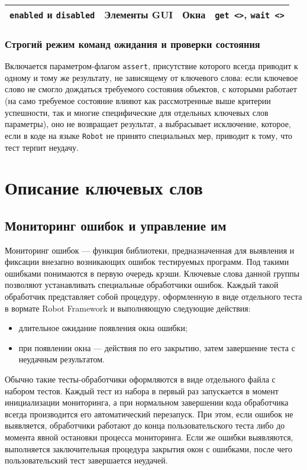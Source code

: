 \documentclass[11pt]{book} %
\begin{document}
\begin{center}
\begin{tabular}{|p{90pt}|p{120pt}|p{100pt}|p{60pt}|}
		\verb|enabled| и \verb|disabled| & Элементы GUI & Окна & \verb|get <>|,  \verb|wait <>|\\ \hline
		
	\end{tabular}
\end{center}


\subsection{Строгий режим команд ожидания и проверки состояния}

Включается параметром-флагом \verb|assert|, присутствие которого всегда приводит к одному и тому же результату, не зависящему от ключевого слова: если ключевое слово не смогло дождаться требуемого состояния объектов, с которыми работает (на само требуемое состояние влияют как рассмотренные выше критерии успешности, так и многие специфические для отдельных ключевых слов параметры), оно не возвращает результат, а выбрасывает исключение, которое, если в коде на языке \verb|Robot| не принято специальных мер, приводит к тому, что тест терпит неудачу.

\chapter{Описание ключевых слов}


\section{Мониторинг ошибок и управление им}

Мониторинг ошибок --- функция библиотеки, предназначенная для выявления и фиксации внезапно возникающих ошибок тестируемых программ. Под такими ошибками понимаются в первую очередь крэши. Ключевые слова данной группы позволяют устанавливать специальные обработчики ошибок. Каждый такой обработчик представляет собой процедуру, оформленную в виде отдельного теста в вормате Robot Framework и выполняющую следующие действия:

\begin{itemize}
\item длительное ожидание появления окна ошибки;
\item при появлении окна --- действия по его закрытию, затем завершение теста с неудачным результатом. 
\end{itemize}

Обычно такие тесты-обработчики оформляются в виде отдельного файла с набором тестов. Каждый тест из набора в первый раз запускается в момент инициализации мониторинга, а при нормальном завершении кода обработчика всегда производится его автоматический перезапуск. При этом, если ошибок не выявляется, обработчики работают до конца пользовательского теста либо до момента явной остановки процесса мониторинга. Если же ошибки выявляются, выполняется заключительная процедура закрытия окон с ошибками, после чего пользовательский тест завершается неудачей.
\end{document}
